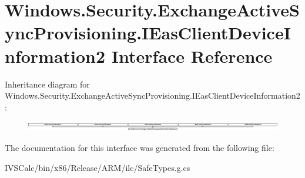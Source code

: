 \hypertarget{interface_windows_1_1_security_1_1_exchange_active_sync_provisioning_1_1_i_eas_client_device_information2}{}\section{Windows.\+Security.\+Exchange\+Active\+Sync\+Provisioning.\+I\+Eas\+Client\+Device\+Information2 Interface Reference}
\label{interface_windows_1_1_security_1_1_exchange_active_sync_provisioning_1_1_i_eas_client_device_information2}
Inheritance diagram for Windows.\+Security.\+Exchange\+Active\+Sync\+Provisioning.\+I\+Eas\+Client\+Device\+Information2\+:\begin{figure}[H]
\begin{center}
\leavevmode
\includegraphics[height=0.461856cm]{interface_windows_1_1_security_1_1_exchange_active_sync_provisioning_1_1_i_eas_client_device_information2}
\end{center}
\end{figure}


The documentation for this interface was generated from the following file\+:\begin{DoxyCompactItemize}
\item 
I\+V\+S\+Calc/bin/x86/\+Release/\+A\+R\+M/ilc/Safe\+Types.\+g.\+cs\end{DoxyCompactItemize}
